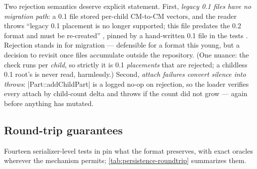 Two rejection semantics deserve explicit statement. First, \emph{legacy 0.1 files have no
migration path}: a 0.1 file stored per-child CM-to-CM  vectors, and the
reader throws ``legacy 0.1  placement is no longer supported; this file
predates the 0.2  format and must be re-created''
, pinned by a hand-written 0.1 file in the tests
. Rejection stands in for migration ---
defensible for a format this young, but a decision to revisit once files accumulate
outside the repository. (One nuance: the check runs per \emph{child}, so strictly it is
0.1 \emph{placements} that are rejected; a childless 0.1 root's  is never
read, harmlessly.) Second, \emph{attach failures convert silence into throws}:
\cppinline|Part::addChildPart| is a logged no-op on rejection, so the loader verifies
every attach by child-count delta and throws if the count did not grow
 --- again before anything has mutated.

\subsection{Round-trip guarantees}\label{sec:persistence-roundtrip}

Fourteen serializer-level tests in  pin what the
format preserves, with exact oracles wherever the mechanism permits;
\cref{tab:persistence-roundtrip} summarizes them.

